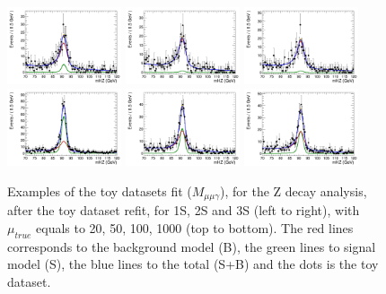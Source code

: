 \begin{figure}[!htbp]
\begin{center}
\includegraphics[width=0.3\textwidth]{figures_and_tables/modeling_xchecks/plots/ZToUpsilon1SPhoton_Cat0_signalStrenght_100/Cat0_mHZ_fit_s}
\includegraphics[width=0.3\textwidth]{figures_and_tables/modeling_xchecks/plots/ZToUpsilon2SPhoton_Cat0_signalStrenght_100/Cat0_mHZ_fit_s}
\includegraphics[width=0.3\textwidth]{figures_and_tables/modeling_xchecks/plots/ZToUpsilon3SPhoton_Cat0_signalStrenght_100/Cat0_mHZ_fit_s}
\includegraphics[width=0.3\textwidth]{figures_and_tables/modeling_xchecks/plots/ZToUpsilon1SPhoton_Cat0_signalStrenght_1000/Cat0_mHZ_fit_s}
\includegraphics[width=0.3\textwidth]{figures_and_tables/modeling_xchecks/plots/ZToUpsilon2SPhoton_Cat0_signalStrenght_1000/Cat0_mHZ_fit_s}
\includegraphics[width=0.3\textwidth]{figures_and_tables/modeling_xchecks/plots/ZToUpsilon3SPhoton_Cat0_signalStrenght_1000/Cat0_mHZ_fit_s}
\end{center}
\caption{Examples of the toy datasets fit ($M_{\mu\mu\gamma}$), for the Z decay analysis, after the toy dataset refit, for 1S, 2S and 3S (left to right), with $\mu_{true}$ equals to 20, 50, 100, 1000 (top to bottom). The red lines corresponds to the background model (B), the green lines to signal model (S), the blue lines to the total (S+B) and the dots is the toy dataset.}
\label{fig:fits_xchecks_mHZ_Z}
\end{figure}



